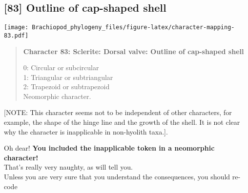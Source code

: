 \documentclass[openany]{book}
\theoremstyle{definition}
\theoremstyle{definition}
\theoremstyle{definition}
\theoremstyle{remark}
\begin{document}
\subsection*{{[}83{]} Outline of cap-shaped
shell}\label{outline-of-cap-shaped-shell}

\texttt{[image: Brachiopod\_phylogeny\_files/figure-latex/character-mapping-83.pdf]}

\begin{quote}
\textbf{Character 83: Sclerite: Dorsal valve: Outline of cap-shaped
shell}

0: Circular or subcircular\\
1: Triangular or subtriangular\\
2: Trapezoid or subtrapezoid\\
Neomorphic character.
\end{quote}

{[}NOTE: This character seems not to be independent of other characters,
for example, the shape of the hinge line and the growth of the shell. It
is not clear why the character is inapplicable in non-hyolith taxa.{]}.

Oh dear! \textbf{You included the inapplicable token in a neomorphic
character!}\\
That's really very naughty, as \citet{Brazeau2018} will tell you.\\
Unless you are very sure that you understand the consequences, you
should re-code
\end{document}
